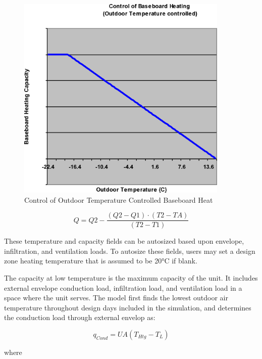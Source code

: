 \begin{figure}[hbtp] %
\centering
\includegraphics[width=0.9\textwidth, height=0.9\textheight, keepaspectratio=true]{media/image5821.png}
\caption{Control of Outdoor Temperature Controlled Baseboard Heat \protect \label{fig:control-of-outdoor-temperature-controlled}}
\end{figure}

\begin{equation}
Q = Q2 - \frac{{(Q2 - Q1)\cdot (T2 - TA)}}{{(T2 - T1)}}
\end{equation}

These temperature and capacity fields can be autosized based upon envelope, infiltration, and ventilation loads. To autosize these fields, users may set a design zone heating temperature that is assumed to be 20°C if blank.

The capacity at low temperature is the maximum capacity of the unit. It includes external envelope conduction load, infiltration load, and ventilation load in a space where the unit serves. The model first finds the lowest outdoor air temperature throughout design days included in the simulation, and determines the conduction load through external envelop as:

\begin{equation}
{q_{Cond}} = UA\left( {{T_{Htg}} - {T_L}} \right)
\end{equation}

where

